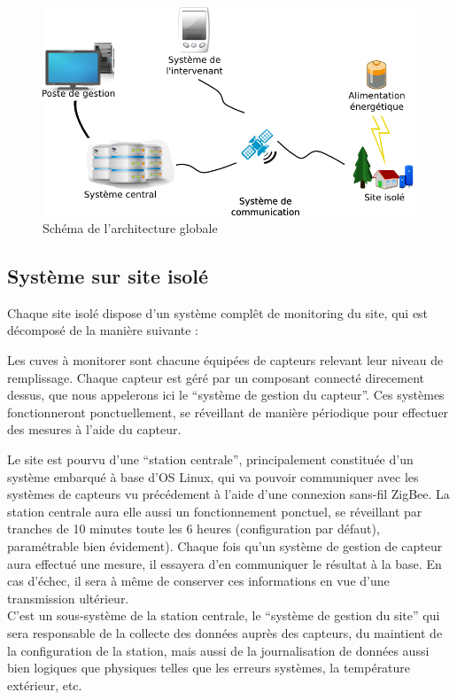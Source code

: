 \begin{figure}[hb]
  \centering
  \includegraphics[width=15cm]{schema_architecture_generale_h4111_bis.png}
  \caption[Schéma de l'architecture globale]%
  {Schéma de l'architecture globale}
\end{figure}

\subsection{Système sur site isolé}

Chaque site isolé dispose d'un système complêt de monitoring du site, qui est décomposé de la manière suivante :

Les cuves à monitorer sont chacune équipées de capteurs relevant leur niveau de remplissage. Chaque capteur est géré par un composant connecté direcement dessus, que nous appelerons ici le ``système de gestion du capteur''. Ces systèmes fonctionneront ponctuellement, se réveillant de manière périodique pour effectuer des mesures à l'aide du capteur.

Le site est pourvu d'une ``station centrale'', principalement constituée d'un système embarqué à base d'OS Linux, qui va pouvoir communiquer avec les systèmes de capteurs vu précédement à l'aide d'une connexion sans-fil ZigBee. La station centrale aura elle aussi un fonctionnement ponctuel, se réveillant par tranches de 10 minutes toute les 6 heures (configuration par défaut), paramétrable bien évidement). Chaque fois qu'un système de gestion de capteur aura effectué une mesure, il essayera d'en communiquer le résultat à la base. En cas d'échec, il sera à même de conserver ces informations en vue d'une transmission ultérieur.\\
C'est un sous-système de la station centrale, le ``système de gestion du site'' qui sera responsable de la collecte des données auprès des capteurs, du maintient de la configuration de la station, mais aussi de la journalisation de données aussi bien logiques que physiques telles que les erreurs systèmes, la température extérieur, etc.


